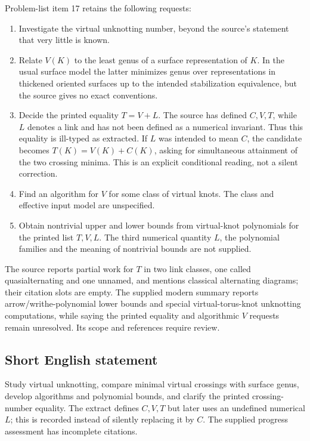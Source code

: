 \documentclass[11pt]{article}
\begin{document}
Problem-list item 17 retains the following requests:
\begin{enumerate}
\item Investigate the virtual unknotting number, beyond the source's statement that very little is known.
\item Relate \(V(K)\) to the least genus of a surface representation of \(K\). In the usual surface model the latter minimizes genus over representations in thickened oriented surfaces up to the intended stabilization equivalence, but the source gives no exact conventions.
\item Decide the printed equality \(T=V+L\). The source has defined \(C,V,T\), while \(L\) denotes a link and has not been defined as a numerical invariant. Thus this equality is ill-typed as extracted. If \(L\) was intended to mean \(C\), the candidate becomes \(T(K)=V(K)+C(K)\), asking for simultaneous attainment of the two crossing minima. This is an explicit conditional reading, not a silent correction.
\item Find an algorithm for \(V\) for some class of virtual knots. The class and effective input model are unspecified.
\item Obtain nontrivial upper and lower bounds from virtual-knot polynomials for the printed list \(T,V,L\). The third numerical quantity \(L\), the polynomial families and the meaning of nontrivial bounds are not supplied.
\end{enumerate}
The source reports partial work for \(T\) in two link classes, one called quasialternating and one unnamed, and mentions classical alternating diagrams; their citation slots are empty. The supplied modern summary reports arrow/writhe-polynomial lower bounds and special virtual-torus-knot unknotting computations, while saying the printed equality and algorithmic \(V\) requests remain unresolved. Its scope and references require review.
\subsection{Short English statement}
Study virtual unknotting, compare minimal virtual crossings with surface genus, develop algorithms and polynomial bounds, and clarify the printed crossing-number equality. The extract defines \(C,V,T\) but later uses an undefined numerical \(L\); this is recorded instead of silently replacing it by \(C\). The supplied progress assessment has incomplete citations.
\end{document}
